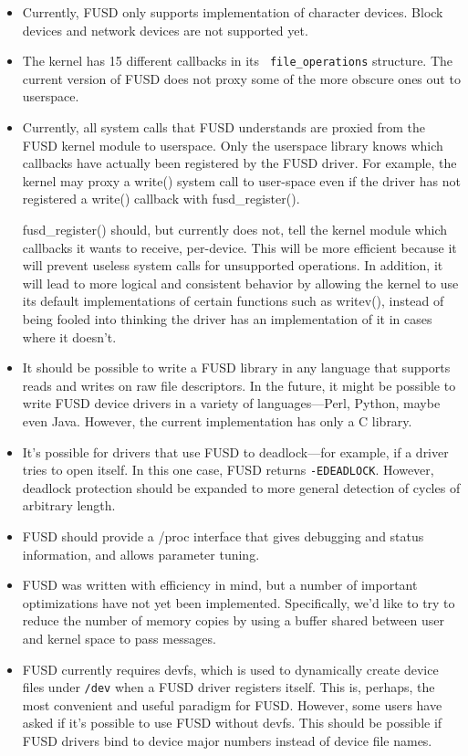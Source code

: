 \documentclass{article}
\begin{document}
\begin{itemize}
\item Currently, FUSD only supports implementation of character
devices.  Block devices and network devices are not supported yet.

\item The kernel has 15 different callbacks in its {\tt
file\_operations} structure.  The current version of FUSD does not
proxy some of the more obscure ones out to userspace.

\item Currently, all system calls that FUSD understands are proxied
from the FUSD kernel module to userspace.  Only the userspace library
knows which callbacks have actually been registered by the FUSD
driver.  For example, the kernel may proxy a write() system call to
user-space even if the driver has not registered a write() callback
with fusd\_register().

fusd\_register() should, but currently does not, tell the kernel
module which callbacks it wants to receive, per-device.  This will be
more efficient because it will prevent useless system calls for
unsupported operations.  In addition, it will lead to more logical and
consistent behavior by allowing the kernel to use its default
implementations of certain functions such as writev(), instead of
being fooled into thinking the driver has an implementation of it in
cases where it doesn't.

\item It should be possible to write a FUSD library in any language
that supports reads and writes on raw file descriptors.  In the
future, it might be possible to write FUSD device drivers in a variety
of languages---Perl, Python, maybe even Java.  However, the current
implementation has only a C library.

\item It's possible for drivers that use FUSD to deadlock---for
example, if a driver tries to open itself.  In this one case, FUSD
returns {\tt -EDEADLOCK}.  However, deadlock protection should be
expanded to more general detection of cycles of arbitrary length.

\item FUSD should provide a /proc interface that gives debugging and
status information, and allows parameter tuning.

\item FUSD was written with efficiency in mind, but a number of
important optimizations have not yet been implemented.  Specifically,
we'd like to try to reduce the number of memory copies by using a
buffer shared between user and kernel space to pass messages.

\item FUSD currently requires devfs, which is used to dynamically
create device files under {\tt /dev} when a FUSD driver registers
itself.   This is, perhaps, the most convenient and useful paradigm
for FUSD.  However, some users have asked if it's possible to use FUSD
without devfs.  This should be possible if FUSD drivers bind to device
major numbers instead of device file names.

\end{itemize}
\end{document}
